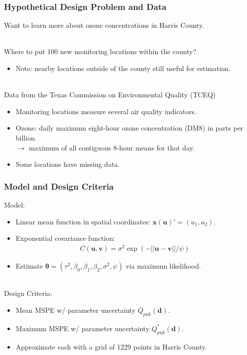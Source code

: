 \documentclass[xcolor=dvipsnames]{beamer}
\begin{document}
\begin{frame}
  \frametitle{Hypothetical Design Problem and Data}
  Want to learn more about ozone concentrations in Harris County. \\~

  Where to put 100 new monitoring locations within the county? \\
  \begin{itemize}
  \item[] Note: nearby locations outside of the county still useful for estimation.\\~\\
  \end{itemize}\pause

  Data from the Texas Commission on Environmental Quality (TCEQ)
  \begin{itemize}
  \item Monitoring locations measure several air quality indicators.
  \item Ozone: daily maximum eight-hour ozone concentration (DM8) in parts per billion.\\
    $\to$ maximum of all contiguous 8-hour means for that day.
  \item Some locations have missing data.
  \end{itemize}
\end{frame}

\begin{frame}
  \frametitle{Model and Design Criteria}
  Model:
  \begin{itemize}
  \item Linear mean function in spatial coordinates: $\bm{x}(\bm{u})' = (u_1, u_2)$. \pause
  \item Exponential covariance function:
    \begin{align*}
      C(\bm{u},\bm{v}) = \sigma^2\exp(-||\bm{u} - \bm{v}||/\psi)
    \end{align*} \pause
  \item Estimate $\bm{\theta} = (\tau^2, \beta_0, \beta_1, \beta_2, \sigma^2, \psi)$ via maximum likelihood. \\~\\ \pause
  \end{itemize}

  Design Criteria:
  \begin{itemize}
  \item Mean MSPE w/ parameter uncertainty $\overline{Q}_{puk}(\bm{d})$.
  \item Maximum MSPE w/ parameter uncertainty $Q^*_{puk}(\bm{d})$.\pause
  \item Approximate each with a grid of 1229 points in Harris County.
  \end{itemize}
\end{frame}
\end{document}
